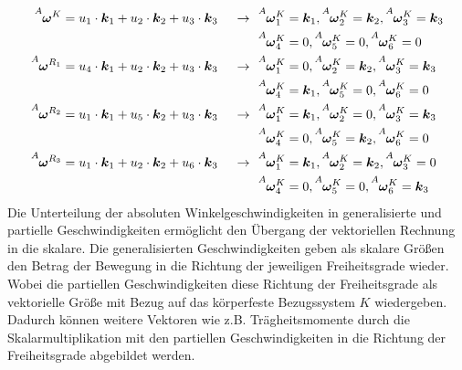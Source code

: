 \begin{align}
\vel{A}{\omega}{K} &= u_1 \cdot \bs{k}_1 + u_2 \cdot \bs{k}_2 + u_3 \cdot \bs{k}_3 &\rArrow &\vel{A}{\omega}{K}_1 = \bs{k}_1, \vel{A}{\omega}{K}_2 = \bs{k}_2, \vel{A}{\omega}{K}_3 = \bs{k}_3 \\
& & &\vel{A}{\omega}{K}_4 = 0, \vel{A}{\omega}{K}_5 = 0, \vel{A}{\omega}{K}_6 = 0 
\\
\vel{A}{\omega}{R_1} &= u_4 \cdot \bs{k}_1 + u_2 \cdot \bs{k}_2 + u_3 \cdot \bs{k}_3 &\rArrow 
&\vel{A}{\omega}{K}_1 = 0, \vel{A}{\omega}{K}_2 = \bs{k}_2, \vel{A}{\omega}{K}_3 = \bs{k}_3 \\
& & &\vel{A}{\omega}{K}_4 = \bs{k}_1, \vel{A}{\omega}{K}_5 = 0, \vel{A}{\omega}{K}_6 = 0 
\\
\vel{A}{\omega}{R_2} &= u_1 \cdot \bs{k}_1 + u_5 \cdot \bs{k}_2 + u_3 \cdot \bs{k}_3&\rArrow 
&\vel{A}{\omega}{K}_1 = \bs{k}_1, \vel{A}{\omega}{K}_2 = 0, \vel{A}{\omega}{K}_3 = \bs{k}_3 \\
& & &\vel{A}{\omega}{K}_4 = 0, \vel{A}{\omega}{K}_5 = \bs{k}_2, \vel{A}{\omega}{K}_6 = 0 
\\
\vel{A}{\omega}{R_3} &= u_1 \cdot \bs{k}_1 + u_2 \cdot \bs{k}_2 + u_6 \cdot \bs{k}_3&\rArrow 
&\vel{A}{\omega}{K}_1 = \bs{k}_1, \vel{A}{\omega}{K}_2 = \bs{k}_2, \vel{A}{\omega}{K}_3 = 0 \\
& & &\vel{A}{\omega}{K}_4 = 0, \vel{A}{\omega}{K}_5 = 0, \vel{A}{\omega}{K}_6 = \bs{k}_3
\end{align}
Die Unterteilung der absoluten Winkelgeschwindigkeiten in generalisierte und partielle Geschwindigkeiten ermöglicht den Übergang der vektoriellen Rechnung in die skalare. Die generalisierten Geschwindigkeiten geben als skalare Größen den Betrag der Bewegung in die Richtung der jeweiligen Freiheitsgrade wieder. Wobei die partiellen Geschwindigkeiten diese Richtung der Freiheitsgrade als vektorielle Größe mit Bezug auf das körperfeste Bezugssystem $K$ wiedergeben. Dadurch können weitere Vektoren wie z.B. Trägheitsmomente durch die Skalarmultiplikation mit den partiellen Geschwindigkeiten in die Richtung der Freiheitsgrade abgebildet werden.